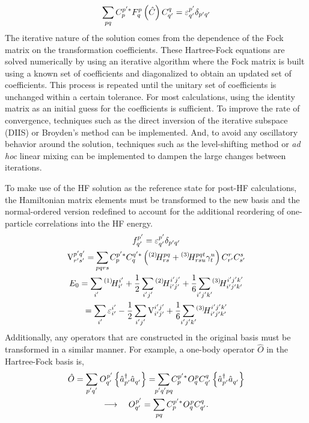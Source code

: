 \documentclass[thesis.tex]{subfiles}
\begin{document}
\begin{equation}
  \sum_{\mathclap{pq}}C^{p'*}_{p}F^{p}_{q}\left(\hat{C}\right)C^{q}_{q'} = \varepsilon^{p'}_{q'}\delta_{p'q'}
\end{equation}
The iterative nature of the solution comes from the dependence of the Fock matrix on the transformation coefficients. These Hartree-Fock equations are solved numerically by using an iterative algorithm where the Fock matrix is built using a known set of coefficients and diagonalized to obtain an updated set of coefficients.  This process is repeated until the unitary set of coefficients is unchanged within a certain tolerance.  For most calculations, using the identity matrix as an initial guess for the coefficients is sufficient.  To improve the rate of convergence, techniques such as the direct inversion of the iterative subspace (DIIS) \cite{PULAY1980393,PULAY1982556} or Broyden's method \cite{BROYDEN1965557} can be implemented.  And, to avoid any oscillatory behavior around the solution, techniques such as the level-shifting method or \textit{ad hoc} linear mixing can be implemented to dampen the large changes between iterations.

To make use of the HF solution as the reference state for post-HF calculations, the Hamiltonian matrix elements must be transformed to the new basis and the normal-ordered version redefined to account for the additional reordering of one-particle correlations into the HF energy.
\begin{gather}
  \fint{p'}{q'} = \varepsilon^{p'}_{q'}\delta_{p'q'} \\
  \vint{p'q'}{r's'} = \sum_{\mathclap{pqrs}} C^{p'*}_{p}C^{q'*}_{q}\left(\Hint{2}{pq}{rs} + \Hint{3}{pqt}{rsu}\gamma^{u}_{t}\right)C^{r}_{r'}C^{s}_{s'} \\
  E_{0} = \sum_{\mathclap{i'}}\Hint{1}{i'}{i'} + \frac{1}{2}\sum_{\mathclap{i'j'}}\Hint{2}{i'j'}{i'j'} + \frac{1}{6}\sum_{\mathclap{i'j'k'}}\Hint{3}{i'j'k'}{i'j'k'} \notag \\
  = \sum_{\mathclap{i'}}\varepsilon^{i'}_{i'} - \frac{1}{2}\sum_{\mathclap{i'j'}}\vint{i'j'}{i'j'} + \frac{1}{6}\sum_{\mathclap{i'j'k'}}\Hint{3}{i'j'k'}{i'j'k'}
\end{gather}
Additionally, any operators that are constructed in the original basis must be transformed in a similar manner.  For example, a one-body operator $\hat{O}$ in the Hartree-Fock basis is,
\begin{gather}
  \hat{O} = \sum_{\mathclap{p'q'}}\opint{}{p'}{q'}\normord{\co{p'}\ao{q'}} = \sum_{\mathclap{p'q'pq}}C^{p'*}_{p}\opint{}{p}{q}C^{q}_{q'}\normord{\co{p'}\ao{q'}} \notag \\
  \longrightarrow\ \ \ \opint{}{p'}{q'} = \sum_{\mathclap{pq}}C^{p'*}_{p}\opint{}{p}{q}C^{q}_{q'}.
\end{gather}
\end{document}
